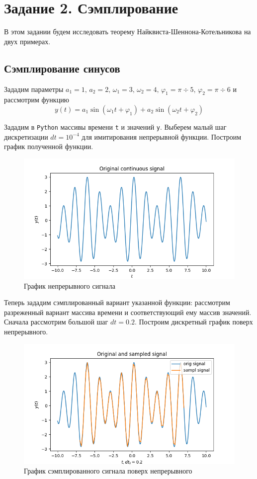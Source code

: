 \documentclass[a4paper, 12pt]{article}
\begin{document}
    \section{Задание 2. Сэмплирование}
    В этом задании будем исследовать теорему Найквиста-Шеннона-Котельникова на двух примерах.
    \subsection{Сэмплирование синусов}
    Зададим параметры $a_1=1,\,a_2=2,\,\omega_1=3,\,\omega_2=4,\,\varphi_1=\pi\div5,\,\varphi_2=\pi\div6$ и рассмотрим функцию
    $$y(t)=a_1\sin{(\omega_1t+\varphi_1)}+a_2\sin{(\omega_2t+\varphi_2)}$$


    Зададим в \texttt{Python} массивы времени \texttt{t} и значений \texttt{y}. Выберем малый шаг дискретизации $dt=10^{-4}$ для
    имитирования непрерывной функции. Построим график полученной функции.
    \begin{figure}[H]
        \centering
        \includegraphics[scale=0.45]{orig1.png}
        \captionsetup{skip=0pt}
        \caption{График непрерывного сигнала}
        \label{fig:orig1}
    \end{figure}


    Теперь зададим сэмплированный вариант указанной функции: рассмотрим
    разреженный вариант массива времени и соответствующий ему массив значений.
    Сначала рассмотрим большой шаг $dt=0.2$.
    Построим дискретный график поверх непрерывного.
    \begin{figure}[H]
        \centering
        \includegraphics[scale=0.45]{1_sine.png}
        \captionsetup{skip=0pt}
        \caption{График сэмплированного сигнала поверх непрерывного}
        \label{fig:1sine}
    \end{figure}
\end{document}
